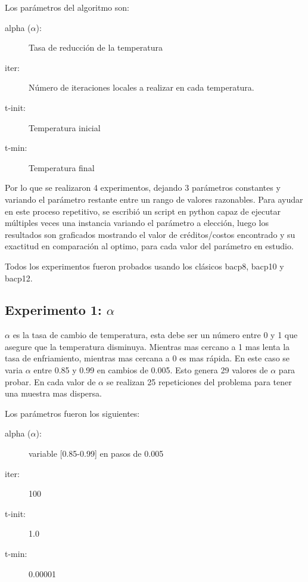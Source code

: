 \documentclass[letterpaper,10pt]{article}
\begin{document}

Los parámetros del algoritmo son:

\begin{description}
  \item[alpha ($\alpha$):] Tasa de reducción de la temperatura
  \item[iter:] Número de iteraciones locales a realizar en cada temperatura.
  \item[t-init:] Temperatura inicial
  \item[t-min:] Temperatura final
\end{description}

Por lo que se realizaron 4 experimentos, dejando 3 parámetros constantes y variando el parámetro restante entre un rango de valores razonables. Para ayudar en este proceso repetitivo, se escribió un script en python capaz de ejecutar múltiples veces una instancia variando el parámetro a elección, luego los resultados son graficados mostrando el valor de créditos/costos encontrado y su exactitud en comparación al optimo, para cada valor del parámetro en estudio.

Todos los experimentos fueron probados usando los clásicos bacp8, bacp10 y bacp12.

\subsection{Experimento 1: $\alpha$}

$\alpha$ es la tasa de cambio de temperatura, esta debe ser un número entre 0 y 1 que asegure que la temperatura disminuya. Mientras mas cercano a 1 mas lenta la tasa de enfriamiento, mientras mas cercana a 0 es mas rápida. En este caso se varia $\alpha$ entre 0.85 y 0.99 en cambios de 0.005. Esto genera 29 valores de $\alpha$ para probar. En cada valor de $\alpha$ se realizan 25 repeticiones del problema para tener una muestra mas dispersa.

Los parámetros fueron los siguientes:

\begin{description}
  \item[alpha ($\alpha$):] variable [0.85-0.99] en pasos de 0.005
  \item[iter:] 100
  \item[t-init:] 1.0
  \item[t-min:] 0.00001
\end{description}
\end{document}
